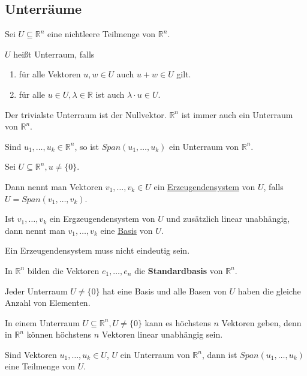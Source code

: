 \documentclass{mg2}
\begin{document}
\newpage
\subsection{Unterräume}
\begin{definition}[Unterraum]
Sei $U \subseteq \mathbb{R}^n$ eine nichtleere Teilmenge von $\mathbb{R}^n$.

$U$ heißt Unterraum, falls
\begin{enumerate}
\item für alle Vektoren $u,w \in U$ auch $u+w \in U$ gilt.
\item für alle $u \in U, \lambda \in \mathbb{R}$ ist auch $\lambda \cdot u \in U$.
\end{enumerate}
\end{definition}

Der trivialste Unterraum ist der Nullvektor. $\mathbb{R}^n$ ist immer auch ein Unterraum von $\mathbb{R}^n$.

\begin{proposition}
Sind $u_1,\dots,u_k \in \mathbb{R}^n$, so ist $Span(u_1,\dots,u_k)$ ein Unterraum von $\mathbb{R}^n$.
\end{proposition}

\begin{definition}
Sei $U \subseteq \mathbb{R}^n, u \neq \{0\}$.

Dann nennt man Vektoren $v_1,\dots, v_k \in U$ ein \underline{Erzeugendensystem} von $U$, falls $U = Span(v_1,\dots,v_k)$.

Ist $v_1,\dots,v_k$ ein Ergzeugendensystem von $U$ und zusätzlich linear unabhängig, dann nennt man $v_1,\dots,v_k$ eine \underline{Basis} von $U$.
\end{definition}

Ein Erzeugendensystem muss nicht eindeutig sein.

In $\mathbb{R}^n$ bilden die Vektoren $e_1, \dots, e_n$ die \textbf{Standardbasis} von $\mathbb{R}^n$.

Jeder Unterraum $U \neq \{0\}$ hat eine Basis und alle Basen von $U$ haben die gleiche Anzahl von Elementen.

In einem Unterraum $U \subseteq \mathbb{R}^n, U \neq \{0\}$ kann es höchstens $n$ Vektoren geben, denn in $\mathbb{R}^n$ können höchstens $n$ Vektoren linear unabhängig sein.

\begin{lemma}
Sind Vektoren $u_1,\dots,u_k \in U$, $U$ ein Unterraum von $\mathbb{R}^n$, dann ist $Span(u_1,\dots,u_k)$ eine Teilmenge von $U$.
\end{lemma}
\end{document}

